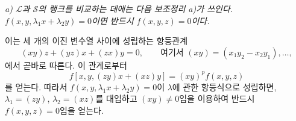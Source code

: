 
\emph{a) $\mathcal L$과 $\mathcal S$의 랭크를 비교하는 데에는 다음 보조정리 a)가 쓰인다. $f(x,y,\lambda_1x+\lambda_2y)=0$이면 반드시 $f(x,y,z)=0$이다.}

이는 세 개의 이진 변수열 사이에 성립하는 항등관계
\[
  (xy)z+(yz)x+(zx)y=0,
  \qquad \text{여기서 }(xy)=(x_1y_2-x_2y_1),\ldots,
\]
에서 곧바로 따른다. 이 관계로부터
\[
  f[x,y,(zy)x+(xz)y]=(xy)^p f(x,y,z)
\]
를 얻는다. 따라서 $f(x,y,\lambda_1x+\lambda_2y)=0$이 $\lambda$에 관한 항등식으로 성립하면, $\lambda_1=(zy)$, $\lambda_2=(xz)$를 대입하고 $(xy)\ne0$임을 이용하여 반드시 $f(x,y,z)=0$임을 얻는다.

